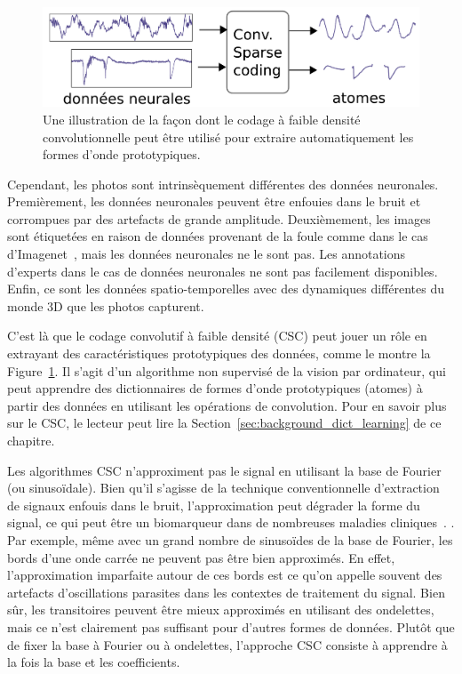 \begin{figure}[t]
\begin{center}
   \includegraphics[width=0.85\linewidth]{figures/schema_sommaire.pdf}
\end{center}
   \caption[]{Une illustration de la façon dont le codage à faible densité convolutionnelle peut être utilisé pour extraire automatiquement les formes d'onde prototypiques.}
   \label{fig:sommaire:csc_schematic}
\end{figure}

Cependant, les photos sont intrinsèquement différentes des données neuronales. Premièrement, les données neuronales peuvent être enfouies dans le bruit et corrompues par des artefacts de grande amplitude. Deuxièmement, les images sont étiquetées en raison de données provenant de la foule comme dans le cas d'Imagenet~\citep{deng2009imagenet}, mais les données neuronales ne le sont pas. Les annotations d'experts dans le cas de données neuronales ne sont pas facilement disponibles. Enfin, ce sont les données spatio-temporelles avec des dynamiques différentes du monde 3D que les photos capturent. 

C'est là que le codage convolutif à faible densité (CSC) peut jouer un rôle en extrayant des caractéristiques prototypiques des données, comme le montre la  Figure~\ref{fig:sommaire:csc_schematic}. Il s'agit d'un algorithme non supervisé de la vision par ordinateur, qui peut apprendre des dictionnaires de formes d'onde prototypiques (atomes) à partir des données en utilisant les opérations de convolution. Pour en savoir plus sur le CSC, le lecteur peut lire la Section~\ref{sec:background_dict_learning} de ce chapitre.

Les algorithmes CSC n'approximent pas le signal en utilisant la base de Fourier (ou sinusoïdale). Bien qu'il s'agisse de la technique conventionnelle d'extraction de signaux enfouis dans le bruit, l'approximation peut dégrader la forme du signal, ce qui peut être un biomarqueur dans de nombreuses maladies cliniques~\citep{cole2017brain}. . Par exemple, même avec un grand nombre de sinusoïdes de la base de Fourier, les bords d'une onde carrée ne peuvent pas être bien approximés. En effet, l'approximation imparfaite autour de ces bords est ce qu'on appelle souvent des artefacts d’oscillations parasites dans les contextes de traitement du signal. Bien sûr, les transitoires peuvent être mieux approximés en utilisant des ondelettes, mais ce n'est clairement pas suffisant pour d'autres formes de données. Plutôt que de fixer la base à Fourier ou à ondelettes, l'approche CSC consiste à apprendre à la fois la base et les coefficients.

